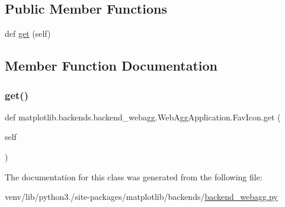 \subsection*{Public Member Functions}
\begin{DoxyCompactItemize}
\item 
def \hyperlink{classmatplotlib_1_1backends_1_1backend__webagg_1_1WebAggApplication_1_1FavIcon_a443c3d4e296f73e52e2f3cf0c8316c34}{get} (self)
\end{DoxyCompactItemize}


\subsection{Member Function Documentation}
\mbox{\label{classmatplotlib_1_1backends_1_1backend__webagg_1_1WebAggApplication_1_1FavIcon_a443c3d4e296f73e52e2f3cf0c8316c34}} 
\subsubsection{\texorpdfstring{get()}{get()}}
{\footnotesize\ttfamily def matplotlib.\+backends.\+backend\+\_\+webagg.\+Web\+Agg\+Application.\+Fav\+Icon.\+get (\begin{DoxyParamCaption}\item[{}]{self }\end{DoxyParamCaption})}



The documentation for this class was generated from the following file\+:\begin{DoxyCompactItemize}
\item 
venv/lib/python3./site-\/packages/matplotlib/backends/\hyperlink{backend__webagg_8py}{backend\+\_\+webagg.\+py}\end{DoxyCompactItemize}
